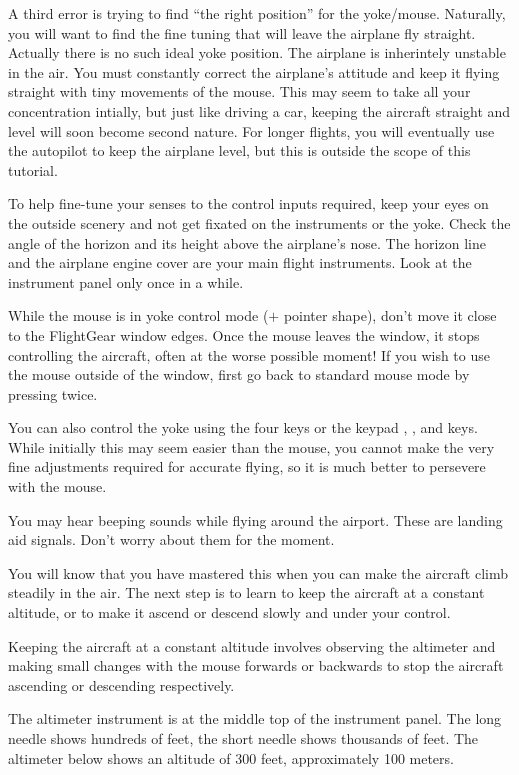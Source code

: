 \begin{itemize}
A third error is trying to find ``the right position'' for the
yoke/mouse. Naturally, you will want to find the fine tuning that will leave
the airplane fly straight. Actually there is no such ideal yoke
position. The airplane is inherintely unstable in the air. You must constantly
correct the airplane's attitude and keep it flying straight with tiny movements
of the mouse. This may seem to take all your concentration intially,
but just like driving a car, keeping the aircraft straight and level will soon
become second nature. For longer flights, you will eventually use the autopilot
to keep the airplane level, but this is outside the scope of this tutorial.

To help fine-tune your senses to the control inputs required, keep your eyes on
the outside scenery and not get fixated on the instruments or the yoke. Check
the angle of the horizon and its height above the airplane's nose. The horizon
line and the airplane engine cover are your main flight instruments. Look at
the instrument panel only once in a while.

While the mouse is in yoke control mode
($+$ pointer shape), don't move it close to the FlightGear window
edges. Once the mouse leaves the window, it stops controlling the aircraft,
often at the worse possible moment!
If you wish to use the mouse outside of the window, first go back to standard
mouse mode by pressing  twice.

You can also control the yoke using the four  keys
or the keypad , ,  and  keys. While initially this
may seem easier than the mouse, you cannot make the very fine adjustments
required for accurate flying, so it is much better to persevere with the mouse.

You may hear beeping sounds while flying around the airport. These are
landing aid signals. Don't worry about them for the
moment.

You will know that you have mastered this when you can make the aircraft climb
steadily in the air. The next step is to learn to keep the aircraft at a
constant altitude, or to make it ascend or descend slowly and under your
control.

Keeping the aircraft at a constant altitude involves observing the altimeter
and making small changes with the mouse forwards or backwards to stop the
aircraft ascending or descending respectively.

 The altimeter instrument is at the middle top of the
instrument panel. The long needle shows hundreds of feet, the short needle
shows thousands of feet. The altimeter below shows an altitude of
300 feet, approximately 100 meters.



\end{itemize}
